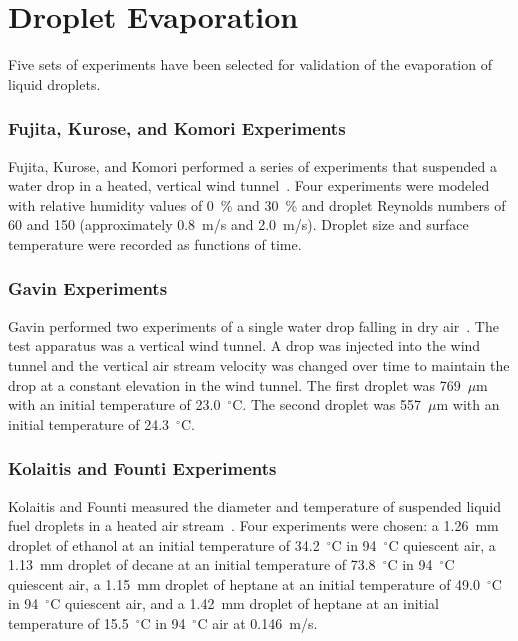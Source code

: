 \section{Droplet Evaporation}
\label{Droplet_Evaporation_Description}

Five sets of experiments have been selected for validation of the evaporation of liquid droplets.

\subsubsection{Fujita, Kurose, and Komori Experiments}
\label{Fujita_exp}

Fujita, Kurose, and Komori performed a series of experiments that suspended a water drop in a heated, vertical wind tunnel~\cite{Fujita}. Four experiments were modeled with relative humidity values of 0~\% and 30~\% and droplet Reynolds numbers of 60 and 150 (approximately 0.8~m/s and 2.0~m/s). Droplet size and surface temperature were recorded as functions of time.

\subsubsection{Gavin Experiments}
\label{Gavin_exp}

Gavin performed two experiments of a single water drop falling in dry air~\cite{Gavin}. The test apparatus was a vertical wind tunnel. A drop was injected into the wind tunnel and the vertical air stream velocity was changed over time to maintain the drop at a constant elevation in the wind tunnel. The first droplet was 769~$\mu$m with an initial temperature of 23.0~$^\circ$C. The second droplet was 557~$\mu$m with an initial temperature of 24.3~$^\circ$C.

\subsubsection{Kolaitis and Founti Experiments}
\label{Kolaitis_exp}

Kolaitis and Founti measured the diameter and temperature of suspended liquid fuel droplets in a heated air stream~\cite{Kolaitis}. Four experiments were chosen: a 1.26~mm droplet of ethanol at an initial temperature of 34.2~$^\circ$C in 94~$^\circ$C quiescent air, a 1.13~mm droplet of decane at an initial temperature of 73.8~$^\circ$C in 94~$^\circ$C quiescent air, a 1.15~mm droplet of heptane at an initial temperature of 49.0~$^\circ$C in 94~$^\circ$C quiescent air, and a 1.42~mm droplet of heptane at an initial temperature of 15.5~$^\circ$C in 94~$^\circ$C air at 0.146~m/s.


